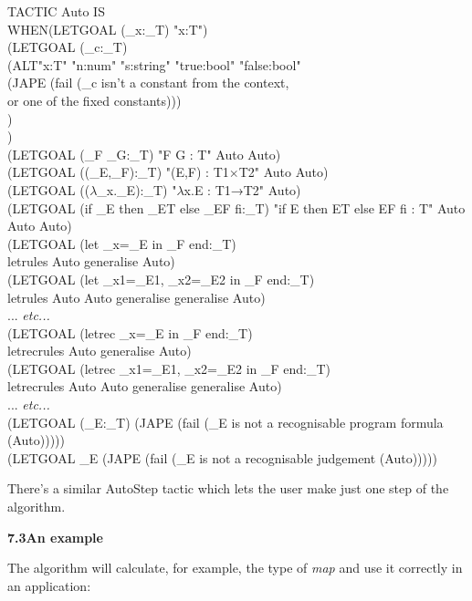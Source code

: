 TACTIC Auto IS\\
\tab WHEN\tab (LETGOAL (\_x:\_T) "x:T")\\
\tab \tab (LETGOAL (\_c:\_T) \\
\tab \tab \tab (ALT\tab "x:T" "n:num" "s:string" "true:bool" "false:bool"\\
\tab \tab \tab \tab (JAPE (fail (\_c isn't a constant from the context, \\
\tab \tab \tab \tab \tab \tab \tab or one of the fixed constants))) \\
\tab \tab \tab )\\
\tab \tab )\\
\tab \tab (LETGOAL (\_F \_G:\_T) "F G : T" Auto Auto)\\
\tab \tab (LETGOAL ((\_E,\_F):\_T) "(E,F) : T1$\times$T2" Auto Auto)\\
\tab \tab (LETGOAL (($\lambda$\_x.\_E):\_T) "$\lambda$x.E : T1→T2" Auto)\\
\tab \tab (LETGOAL (if \_E then \_ET else \_EF fi:\_T) "if E then ET else EF fi : T" Auto Auto Auto)\\
\tab \tab (LETGOAL (let \_x=\_E in \_F end:\_T) \\
\tab \tab \tab \tab letrules Auto generalise Auto)\\
\tab \tab (LETGOAL (let \_x1=\_E1, \_x2=\_E2 in \_F end:\_T) \\
\tab \tab \tab \tab letrules Auto Auto generalise generalise Auto)\\
\tab \tab ... \textit{etc...}\\
\tab \tab (LETGOAL (letrec \_x=\_E in \_F end:\_T) \\
\tab \tab \tab \tab letrecrules Auto generalise Auto)\\
\tab \tab (LETGOAL (letrec \_x1=\_E1, \_x2=\_E2 in \_F end:\_T) \\
\tab \tab \tab \tab letrecrules Auto Auto generalise generalise Auto)\\
\tab \tab ... \textit{etc...}\\
\tab \tab (LETGOAL (\_E:\_T) (JAPE (fail (\_E is not a recognisable program formula (Auto)))))\\
\tab \tab (LETGOAL \_E (JAPE (fail (\_E is not a recognisable judgement (Auto)))))


There's a similar AutoStep tactic which lets the user make just one step of the algorithm.


\textbf{{\large 7.3\tab An example}}


The algorithm will calculate, for example, the type of \textit{map} and use it correctly in an application:

